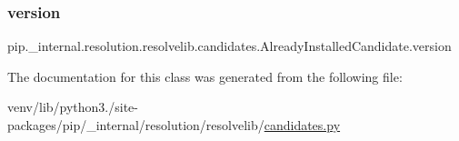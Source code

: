 \subsubsection{\texorpdfstring{version}{version}}
{\footnotesize\ttfamily pip.\+\_\+internal.\+resolution.\+resolvelib.\+candidates.\+Already\+Installed\+Candidate.\+version}



The documentation for this class was generated from the following file\+:\begin{DoxyCompactItemize}
\item 
venv/lib/python3./site-\/packages/pip/\+\_\+internal/resolution/resolvelib/\hyperlink{candidates_8py}{candidates.\+py}\end{DoxyCompactItemize}
